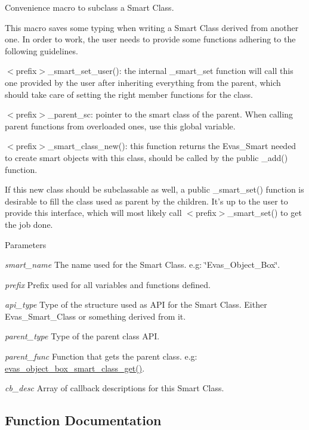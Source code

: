 Convenience macro to subclass a Smart Class. 

This macro saves some typing when writing a Smart Class derived from another one. In order to work, the user needs to provide some functions adhering to the following guidelines.
\begin{DoxyItemize}
\item $<$prefix$>$\_\-smart\_\-set\_\-user(): the internal \_\-smart\_\-set function will call this one provided by the user after inheriting everything from the parent, which should take care of setting the right member functions for the class.
\item $<$prefix$>$\_\-parent\_\-sc: pointer to the smart class of the parent. When calling parent functions from overloaded ones, use this global variable.
\item $<$prefix$>$\_\-smart\_\-class\_\-new(): this function returns the Evas\_\-Smart needed to create smart objects with this class, should be called by the public \_\-add() function.
\item If this new class should be subclassable as well, a public \_\-smart\_\-set() function is desirable to fill the class used as parent by the children. It's up to the user to provide this interface, which will most likely call $<$prefix$>$\_\-smart\_\-set() to get the job done.
\end{DoxyItemize}


\begin{DoxyParams}{Parameters}
\item[{\em smart\_\-name}]The name used for the Smart Class. e.g: \char`\"{}Evas\_\-Object\_\-Box\char`\"{}. \item[{\em prefix}]Prefix used for all variables and functions defined. \item[{\em api\_\-type}]Type of the structure used as API for the Smart Class. Either Evas\_\-Smart\_\-Class or something derived from it. \item[{\em parent\_\-type}]Type of the parent class API. \item[{\em parent\_\-func}]Function that gets the parent class. e.g: \hyperlink{group__Evas__Object__Box_ga58da2c7328e5c8a01a8817f934d083ff}{evas\_\-object\_\-box\_\-smart\_\-class\_\-get()}. \item[{\em cb\_\-desc}]Array of callback descriptions for this Smart Class. \end{DoxyParams}


\subsection{Function Documentation}
